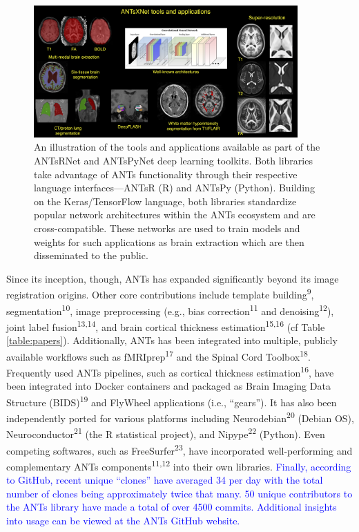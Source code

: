 \documentclass[12pt,]{article}
\begin{document}
\begin{figure}[htbp]
  \centering
    \includegraphics[width=0.9\textwidth]{Figures/coreANtsXNetTools.png}
    \caption{An illustration of the tools and applications available as part of the
    ANTsRNet and ANTsPyNet deep learning toolkits.  Both libraries take advantage
    of ANTs functionality through their respective language interfaces---ANTsR (R)
    and ANTsPy (Python).  Building on the Keras/TensorFlow language, both libraries
    standardize popular network architectures within the ANTs ecosystem and are
    cross-compatible.  These networks are used to train models and weights for such
    applications as brain extraction which are then disseminated to the public.}
 \label{fig:antsXnetTools}
 \end{figure}

Since its inception, though, ANTs has expanded significantly beyond its
image registration origins. Other core contributions include template
building\textsuperscript{9}, segmentation\textsuperscript{10}, image
preprocessing (e.g., bias correction\textsuperscript{11} and
denoising\textsuperscript{12}), joint label
fusion\textsuperscript{13,14}, and brain cortical thickness
estimation\textsuperscript{15,16} (cf Table \ref{table:papers}).
Additionally, ANTs has been integrated into multiple, publicly available
workflows such as fMRIprep\textsuperscript{17} and the Spinal Cord
Toolbox\textsuperscript{18}. Frequently used ANTs pipelines, such as
cortical thickness estimation\textsuperscript{16}, have been integrated
into Docker containers and packaged as Brain Imaging Data Structure
(BIDS)\textsuperscript{19} and FlyWheel applications (i.e., ``gears'').
It has also been independently ported for various platforms including
Neurodebian\textsuperscript{20} (Debian OS),
Neuroconductor\textsuperscript{21} (the R statistical project), and
Nipype\textsuperscript{22} (Python). Even competing softwares, such as
FreeSurfer\textsuperscript{23}, have incorporated well-performing and
complementary ANTs components\textsuperscript{11,12} into their own
libraries.
\textcolor{blue}{Finally, according to GitHub, recent unique “clones” have
averaged 34 per day with the total number of clones being approximately twice
that many.  50 unique contributors to the ANTs library have made a total of over
4500 commits. Additional insights into usage can be viewed at the ANTs GitHub
website.}
\end{document}
